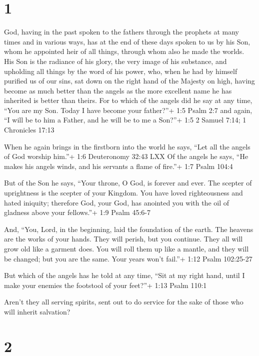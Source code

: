 \hypertarget{section}{%
\section{1}\label{section}}

 God, having in the past spoken to the fathers through the
prophets at many times and in various ways,  has at the end
of these days spoken to us by his Son, whom he appointed heir of all
things, through whom also he made the worlds.  His Son is
the radiance of his glory, the very image of his substance, and
upholding all things by the word of his power, who, when he had by
himself purified us of our sins, sat down on the right hand of the
Majesty on high,  having become as much better than the
angels as the more excellent name he has inherited is better than
theirs.  For to which of the angels did he say at any time,
``You are my Son. Today I have become your father?''+ 1:5 Psalm 2:7 and
again, ``I will be to him a Father, and he will be to me a Son?''+ 1:5 2
Samuel 7:14; 1 Chronicles 17:13

 When he again brings in the firstborn into the world he
says, ``Let all the angels of God worship him.''+ 1:6 Deuteronomy 32:43
LXX  Of the angels he says, ``He makes his angels winds, and
his servants a flame of fire.''+ 1:7 Psalm 104:4

 But of the Son he says, ``Your throne, O God, is forever
and ever. The scepter of uprightness is the scepter of your Kingdom.
 You have loved righteousness and hated iniquity; therefore
God, your God, has anointed you with the oil of gladness above your
fellows.''+ 1:9 Psalm 45:6-7

 And, ``You, Lord, in the beginning, laid the foundation of
the earth. The heavens are the works of your hands.  They
will perish, but you continue. They all will grow old like a garment
does.  You will roll them up like a mantle, and they will
be changed; but you are the same. Your years won't fail.''+ 1:12 Psalm
102:25-27

 But which of the angels has he told at any time, ``Sit at
my right hand, until I make your enemies the footstool of your feet?''+
1:13 Psalm 110:1

 Aren't they all serving spirits, sent out to do service
for the sake of those who will inherit salvation?

\hypertarget{section-1}{%
\section{2}\label{section-1}}

